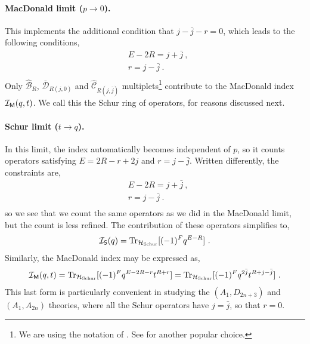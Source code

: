 \documentclass[a4paper,10pt]{article}
\newcommand{\mr}[1]{\mathsf{#1}}
\def\CI {{\cal I}}
\def\CI {{{\cal I}}}
\begin{document}
\begin{appendix}
\paragraph{MacDonald limit ($p\to 0$).} This implements the additional condition that $j-\bar{j}-r=0$, which leads to the following conditions,
\begin{equation}
    \begin{split}
        &E-2R=j+\bar{j}~, \\
        &r=j-\bar{j}~. \\
    \end{split}
\end{equation}
Only $\hat{\mathcal{B}}_R$, $\bar{\mathcal{D}}_{R(j,0)}$ and $\hat{\mathcal{C}}_{R(j,\bar{j})}$ multiplets\footnote{We are using the notation of \cite{Dolan:2002zh}. See \cite{Cordova:2016emh} for another popular choice.} contribute to the MacDonald index $\CI_{\mr{M}}(q,t)$. We call this the Schur ring of operators, for reasons discussed next.

\paragraph{Schur limit ($t\to q$).} In this limit, the index automatically becomes independent of $p$, so it counts operators satisfying $E=2R-r+2j$ and $r=j-\bar{j}$. Written differently, the constraints are,
\begin{equation}
    \begin{split}
        &E-2R=j+\bar{j}~, \\
        &r=j-\bar{j}~. \\
    \end{split}
\end{equation}
so we see that we count the same operators as we did in the MacDonald limit, but the count is less refined. The contribution of these operators simplifies to,
\begin{equation}
    \CI_{\mr{S}}(q)=\text{Tr}_{\mathcal{H}_{\text{Schur}}}[(-1)^Fq^{E-R}]~.
\end{equation}
Similarly, the MacDonald index may be expressed as,
\begin{equation}
    \CI_{\mr{M}}(q,t)=\text{Tr}_{\mathcal{H}_{\text{Schur}}}[(-1)^Fq^{E-2R-r}t^{R+r}]=\text{Tr}_{\mathcal{H}_{\text{Schur}}}[(-1)^Fq^{2\bar{j}}t^{R+j-\bar{j}}]~.
\end{equation}
This last form is particularly convenient in studying the $(A_1,D_{2n+3})$ and $(A_1,A_{2n})$ theories, where all the Schur operators have $j=\bar{j}$, so that $r=0$. 

\end{appendix}
\end{document}
